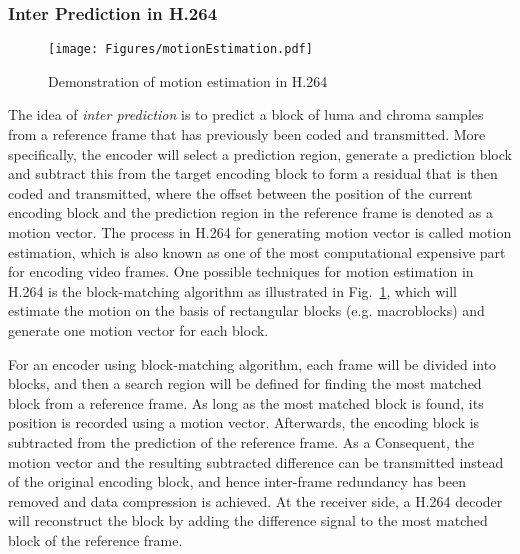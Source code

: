 \subsubsection{Inter Prediction in H.264}
\label{sec::MEIntro}
%
\begin{figure}
\begin{center}
\texttt{[image: Figures/motionEstimation.pdf]}
\caption{\label{fig::MEIntro}Demonstration of motion estimation in H.264}
\end{center}
\end{figure}
%
The idea of \emph{inter prediction} is to predict a block of luma and chroma samples from a reference frame that has previously been coded and transmitted.
More specifically, the encoder will select a prediction region, generate a prediction block and subtract this from the target encoding block to form a residual that is then coded and transmitted, where the offset between the position of the current encoding block and the prediction region in the reference frame is denoted as a motion vector.
The process in H.264 for generating motion vector is called motion estimation, which is also known as one of the most computational expensive part for encoding video frames.
One possible techniques for motion estimation in H.264 is the block-matching algorithm as illustrated in Fig.~\ref{fig::MEIntro}, which will estimate the motion on the basis of rectangular blocks (e.g. macroblocks) and generate one motion vector for each block.

For an encoder using block-matching algorithm, each frame will be divided into blocks, and then a search region will be defined for finding the most matched block from a reference frame.
As long as the most matched block is found, its position is recorded using a motion vector.
Afterwards, the encoding block is subtracted from the prediction of the reference frame. As a Consequent, the motion vector and the resulting subtracted difference can be transmitted instead of the original encoding block, and hence inter-frame redundancy has been removed and data compression is achieved.
At the receiver side, a H.264 decoder will reconstruct the block by adding the difference signal to the most matched block of the reference frame.